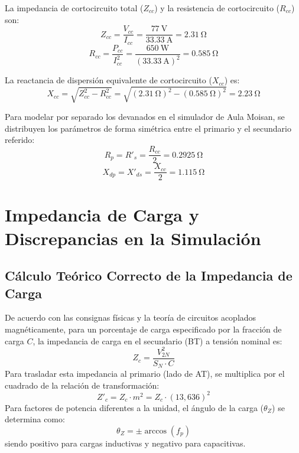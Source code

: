 La impedancia de cortocircuito total ($Z_{cc}$) y la resistencia de cortocircuito ($R_{cc}$) son:
\begin{equation*}
    Z_{cc} = \frac{V_{cc}}{I_{cc}} = \frac{\SI{77}{\volt}}{\SI{33,33}{\ampere}} = \SI{2,31}{\ohm}
\end{equation*}
\begin{equation*}
    R_{cc} = \frac{P_{cc}}{I_{cc}^2} = \frac{\SI{650}{\watt}}{(\SI{33,33}{\ampere})^2} = \SI{0,585}{\ohm}
\end{equation*}

La reactancia de dispersión equivalente de cortocircuito ($X_{cc}$) es:
\begin{equation*}
    X_{cc} = \sqrt{Z_{cc}^2 - R_{cc}^2} = \sqrt{(\SI{2,31}{\ohm})^2 - (\SI{0,585}{\ohm})^2} = \SI{2,23}{\ohm}
\end{equation*}

Para modelar por separado los devanados en el simulador de Aula Moisan, se distribuyen los parámetros de forma
simétrica entre el primario y el secundario referido:
\begin{equation*}
    R_p = R'_s = \frac{R_{cc}}{2} = \SI{0,2925}{\ohm}
\end{equation*}
\begin{equation*}
    X_{dp} = X'_{ds} = \frac{X_{cc}}{2} = \SI{1,115}{\ohm}
\end{equation*}


\section{Impedancia de Carga y Discrepancias en la Simulación}

\subsection{Cálculo Teórico Correcto de la Impedancia de Carga}
De acuerdo con las consignas físicas y la teoría de circuitos acoplados magnéticamente, para un porcentaje de carga
especificado por la fracción de carga $C$, la impedancia de carga en el secundario (BT) a tensión nominal es:
\begin{equation}
    Z_c = \frac{V_{2N}^2}{S_N \cdot C}
\end{equation}
Para trasladar esta impedancia al primario (lado de AT), se multiplica por el cuadrado de la relación de transformación:
\begin{equation*}
    Z'_c = Z_c \cdot m^2 = Z_c \cdot (13,636)^2
\end{equation*}
Para factores de potencia diferentes a la unidad, el ángulo de la carga ($\theta_Z$) se determina como:
\begin{equation}
    \theta_Z = \pm\arccos(f_p)
\end{equation}
siendo positivo para cargas inductivas y negativo para capacitivas.

